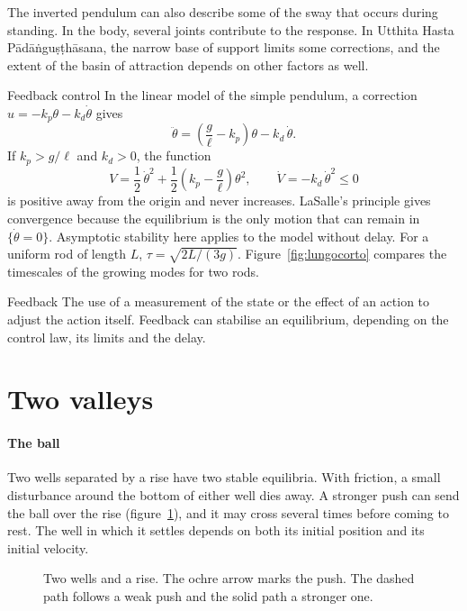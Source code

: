 The inverted pendulum can also describe some of the sway that occurs during standing. In the body, several joints contribute to the response. In Utthita Hasta Pādāṅguṣṭhāsana, the narrow base of support limits some corrections, and the extent of the basin of attraction depends on other factors as well.

\begin{formule}{Feedback control}
In the linear model of the simple pendulum, a correction $u=-k_p\theta-k_d\dot{\theta}$ gives
\[
\ddot{\theta}=\left(\frac{g}{\ell}-k_p\right)\theta-k_d\,\dot{\theta}.
\]
If $k_p>g/\ell$ and $k_d>0$, the function
\[
V=\frac{1}{2}\,\dot{\theta}^{2}+\frac{1}{2}\left(k_p-\frac{g}{\ell}\right)\theta^{2},
\qquad
\dot V=-k_d\,\dot{\theta}^{2}\le 0
\]
is positive away from the origin and never increases. LaSalle's principle gives convergence because the equilibrium is the only motion that can remain in $\{\dot{\theta}=0\}$. Asymptotic stability here applies to the model without delay. For a uniform rod of length $L$, $\tau=\sqrt{2L/(3g)}$. Figure~\ref{fig:lungocorto} compares the timescales of the growing modes for two rods.
\end{formule}

\begin{parola}{Feedback}
The use of a measurement of the state or the effect of an action to adjust the action itself. Feedback can stabilise an equilibrium, depending on the control law, its limits and the delay.
\end{parola}

\section{Two valleys}\label{sec:valli}

\paragraph{The ball} Two wells separated by a rise have two stable equilibria. With friction, a small disturbance around the bottom of either well dies away. A stronger push can send the ball over the rise (figure~\ref{fig:dueconche}), and it may cross several times before coming to rest. The well in which it settles depends on both its initial position and its initial velocity.

\begin{figure}
\caption{Two wells and a rise. The ochre arrow marks the push. The dashed path follows a weak push and the solid path a stronger one.}
\label{fig:dueconche}
\end{figure}

